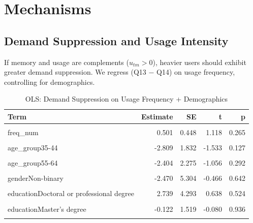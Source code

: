 \documentclass[
]{article}
\begin{document}
\section{Mechanisms}\label{mechanisms}

\subsection{Demand Suppression and Usage
Intensity}\label{demand-suppression-and-usage-intensity}

If memory and usage are complements (\(u_{tm} > 0\)), heavier users
should exhibit greater demand suppression. We regress (Q13 \(-\) Q14) on
usage frequency, controlling for demographics.

\begin{longtable}[t]{lrrrr}
\caption{\label{tab:tab-reg}OLS: Demand Suppression on Usage Frequency + Demographics}\\
\toprule
Term & Estimate & SE & t & p\\
\midrule
\cellcolor{gray!10}{(Intercept)} & \cellcolor{gray!10}{3.093} & \cellcolor{gray!10}{2.351} & \cellcolor{gray!10}{1.315} & \cellcolor{gray!10}{0.190}\\
freq\_num & 0.501 & 0.448 & 1.118 & 0.265\\
\cellcolor{gray!10}{age\_group25-34} & \cellcolor{gray!10}{-2.880} & \cellcolor{gray!10}{1.867} & \cellcolor{gray!10}{-1.543} & \cellcolor{gray!10}{0.125}\\
age\_group35-44 & -2.809 & 1.832 & -1.533 & 0.127\\
\cellcolor{gray!10}{age\_group45-54} & \cellcolor{gray!10}{-5.073} & \cellcolor{gray!10}{1.936} & \cellcolor{gray!10}{-2.620} & \cellcolor{gray!10}{0.010}\\
\addlinespace
age\_group55-64 & -2.404 & 2.275 & -1.056 & 0.292\\
\cellcolor{gray!10}{age\_group65+} & \cellcolor{gray!10}{-3.700} & \cellcolor{gray!10}{2.510} & \cellcolor{gray!10}{-1.474} & \cellcolor{gray!10}{0.142}\\
genderNon-binary & -2.470 & 5.304 & -0.466 & 0.642\\
\cellcolor{gray!10}{genderWoman} & \cellcolor{gray!10}{-0.468} & \cellcolor{gray!10}{0.981} & \cellcolor{gray!10}{-0.476} & \cellcolor{gray!10}{0.634}\\
educationDoctoral or professional degree & 2.739 & 4.293 & 0.638 & 0.524\\
\addlinespace
\cellcolor{gray!10}{educationHigh school or less} & \cellcolor{gray!10}{-3.111} & \cellcolor{gray!10}{1.483} & \cellcolor{gray!10}{-2.097} & \cellcolor{gray!10}{0.037}\\
educationMaster's degree & -0.122 & 1.519 & -0.080 & 0.936\\
\cellcolor{gray!10}{educationSome college} & \cellcolor{gray!10}{1.066} & \cellcolor{gray!10}{1.154} & \cellcolor{gray!10}{0.924} & \cellcolor{gray!10}{0.357}\\
\bottomrule
\end{longtable}
\end{document}
